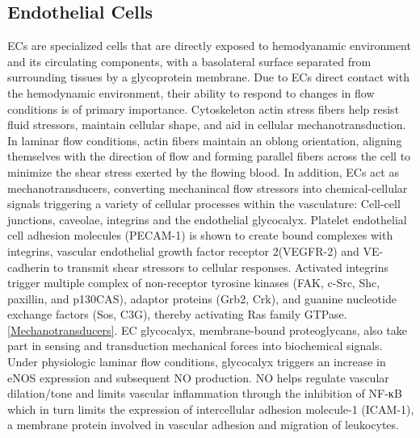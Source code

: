 \subsection{Endothelial Cells}
ECs are specialized cells that are directly exposed to hemodyanamic environment and its circulating components, with a basolateral surface separated from surrounding tissues by a glycoprotein membrane. Due to ECs direct contact with the hemodynamic environment, their ability to respond to changes in flow conditions is of primary importance. Cytoskeleton actin stress fibers help resist fluid stressors, maintain cellular shape, and aid in cellular mechanotransduction. In laminar flow conditions, actin fibers maintain an oblong orientation, aligning themselves with the direction of flow and forming parallel fibers across the cell to minimize the shear stress exerted by the flowing blood. In addition, ECs act as mechanotransducers, converting mechanincal flow stressors into chemical-cellular signals triggering a variety of cellular processes within the vasculature\cite{CHATZIZISIS20072379}: Cell-cell junctions\cite{dorland2017cell}, caveolae\cite{Shihata2016}, integrins\cite{chien2007mechanotransduction} and the endothelial glycocalyx\cite{cancel2016endothelial}.  Platelet endothelial cell adhesion molecules (PECAM-1) is shown to create bound complexes with integrins\cite{chistiakov2017effects,moriguchi2015pecam}, vascular endothelial growth factor receptor 2(VEGFR-2) and VE-cadherin to transmit shear stressors to cellular responses\cite{chatterjee2018endothelial}. Activated integrins trigger multiple complex of non-receptor tyrosine kinases (FAK, c-Src, Shc, paxillin, and p130CAS), adaptor proteins (Grb2, Crk), and guanine nucleotide exchange factors (Sos, C3G), thereby activating Ras family GTPase.\ref{Mechanotransducers}. EC glycocalyx, membrane-bound proteoglycans, also take part in sensing and transduction mechanical forces into biochemical signals\cite{cooper2017stenosis,mitra2018comparative,cooper2018increased}. Under physiologic laminar flow conditions, glycocalyx triggers an increase in eNOS expression and subsequent NO production\cite{cancel2016endothelial,Frösen2012,zeng2017endothelial}. NO helps regulate vascular dilation/tone and limits vascular inflammation through the inhibition of NF-κB\cite{mcdonald2016glycocalyx,cha2018palmitate} which in turn limits the expression of intercellular adhesion molecule-1 (ICAM-1), a membrane protein involved in vascular adhesion and migration of leukocytes.


